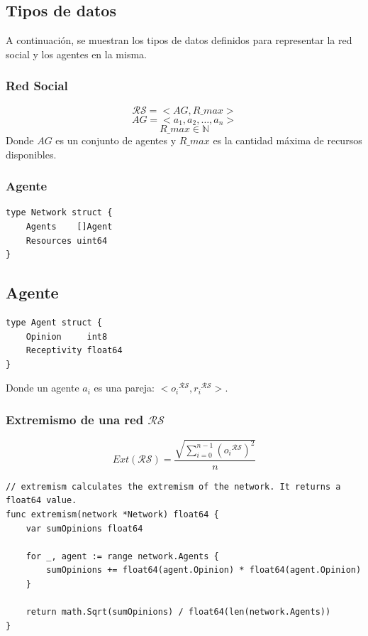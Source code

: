 \documentclass[letterpaper,10pt]{article}
\begin{document}
\subsection{Tipos de datos}
A continuación, se muestran los tipos de datos definidos para representar la red social y los agentes en la misma.
\subsubsection*{Red Social}
\[
  \mathcal{R} \mathcal{S}  = < AG, R\_max >
\]
\[
  AG = < a_1, a_2, \ldots, a_n >
\]
\[
  R\_max \in \mathbb{N}
\]
Donde $AG$ es un conjunto de agentes y $R\_max$ es la cantidad máxima de recursos disponibles.
\subsubsection*{Agente}
\begin{lstlisting}[caption={Definición de red social}, label={lst:r_s}]
type Network struct {
    Agents    []Agent
    Resources uint64
}
\end{lstlisting}
\subsection*{Agente}

\begin{lstlisting}[caption={Definición de agente}, label={lst:agente}]
type Agent struct {
    Opinion     int8
    Receptivity float64
}
\end{lstlisting}
Donde un agente $a_i$ es una pareja: $<{o_i}{^{\mathcal{R} \mathcal{S}}}, {r_i}{^{\mathcal{R} \mathcal{S}}}>$.
\newpage
\subsubsection*{Extremismo de una red $\mathcal{R}\mathcal{S}$}
\[
  Ext(\mathcal{R}\mathcal{S}) = \frac{\sqrt{\sum_{i=0}^{n-1}{({o_i}{^{\mathcal{R} \mathcal{S}}})^2}}}{n}
\]
\begin{lstlisting}[caption={Implementación del extremismo}, label={lst:ext}]
// extremism calculates the extremism of the network. It returns a float64 value.
func extremism(network *Network) float64 {
	var sumOpinions float64

	for _, agent := range network.Agents {
		sumOpinions += float64(agent.Opinion) * float64(agent.Opinion)
	}

	return math.Sqrt(sumOpinions) / float64(len(network.Agents))
}
\end{lstlisting}
\end{document}
